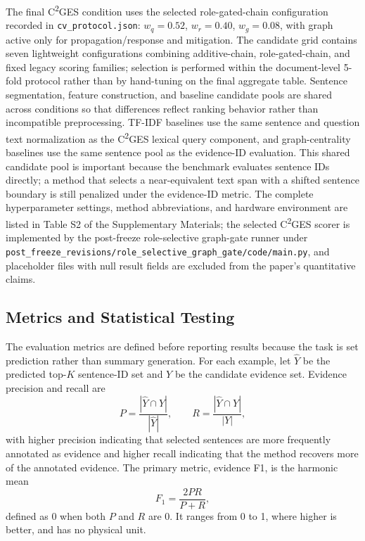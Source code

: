 \documentclass{article}
\begin{document}
The final C\textsuperscript{2}GES condition uses the selected role-gated-chain configuration recorded in \texttt{cv\_protocol.json}: $w_q=0.52$, $w_r=0.40$, $w_g=0.08$, with graph active only for propagation/response and mitigation. The candidate grid contains seven lightweight configurations combining additive-chain, role-gated-chain, and fixed legacy scoring families; selection is performed within the document-level 5-fold protocol rather than by hand-tuning on the final aggregate table. Sentence segmentation, feature construction, and baseline candidate pools are shared across conditions so that differences reflect ranking behavior rather than incompatible preprocessing. TF-IDF baselines use the same sentence and question text normalization as the C\textsuperscript{2}GES lexical query component, and graph-centrality baselines use the same sentence pool as the evidence-ID evaluation. This shared candidate pool is important because the benchmark evaluates sentence IDs directly; a method that selects a near-equivalent text span with a shifted sentence boundary is still penalized under the evidence-ID metric. The complete hyperparameter settings, method abbreviations, and hardware environment are listed in Table S2 of the Supplementary Materials; the selected C\textsuperscript{2}GES scorer is implemented by the post-freeze role-selective graph-gate runner under \texttt{post_freeze_revisions/role_selective_graph_gate/code/main.py}, and placeholder files with null result fields are excluded from the paper's quantitative claims.

\subsection{Metrics and Statistical Testing}
\label{sec:metrics}

The evaluation metrics are defined before reporting results because the task is set prediction rather than summary generation. For each example, let $\hat{Y}$ be the predicted top-$K$ sentence-ID set and $Y$ be the candidate evidence set. Evidence precision and recall are
\begin{equation}
P=\frac{|\hat{Y}\cap Y|}{|\hat{Y}|},
\qquad
R=\frac{|\hat{Y}\cap Y|}{|Y|},
\label{eq:pr}
\end{equation}
with higher precision indicating that selected sentences are more frequently annotated as evidence and higher recall indicating that the method recovers more of the annotated evidence. The primary metric, evidence F1, is the harmonic mean
\begin{equation}
F_1=\frac{2PR}{P+R},
\label{eq:f1}
\end{equation}
defined as 0 when both $P$ and $R$ are 0. It ranges from 0 to 1, where higher is better, and has no physical unit.
\end{document}
